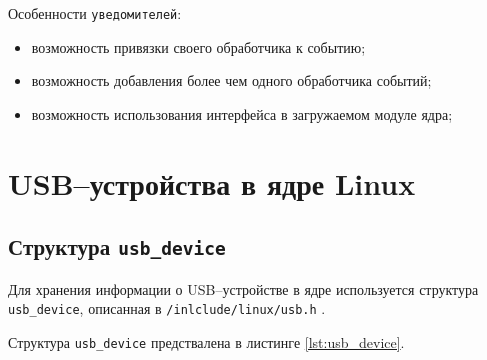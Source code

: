 Особенности \texttt{уведомителей}:

\begin{itemize}
	\item возможность привязки своего обработчика к событию;
	\item возможность добавления более чем одного обработчика событий;
	\item возможность использования интерфейса в загружаемом модуле ядра;
\end{itemize}

\section{USB--устройства в ядре Linux}

\subsection{Структура \texttt{usb\_device}}

Для хранения информации о USB--устройстве в ядре используется структура \texttt{usb\_device}, описанная в \texttt{/inlclude/linux/usb.h} \cite{usb_device}.

Структура \texttt{usb\_device} предствалена в листинге \ref{lst:usb_device}.

